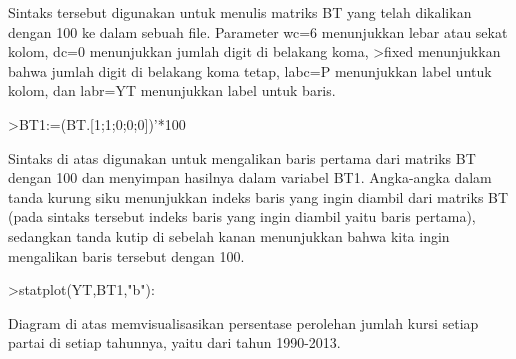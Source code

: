 \documentclass[a4paper,10pt]{article}
\begin{document}
\begin{eulernotebook}
\begin{eulercomment}
\begin{eulercomment}
\begin{eulercomment}
\begin{eulercomment}
\begin{eulercomment}
\begin{eulercomment}
\begin{eulercomment}
\begin{eulercomment}
\begin{eulercomment}
\begin{eulercomment}
\begin{eulercomment}
\begin{eulercomment}
\begin{eulercomment}
\begin{eulercomment}
\begin{eulercomment}
\begin{eulercomment}
\begin{euleroutput}
\end{euleroutput}
\begin{eulercomment}
Sintaks tersebut digunakan untuk menulis matriks BT yang telah
dikalikan dengan 100 ke dalam sebuah file. Parameter wc=6 menunjukkan
lebar atau sekat kolom, dc=0 menunjukkan jumlah digit di belakang
koma, \textgreater{}fixed menunjukkan bahwa jumlah digit di belakang koma tetap,
labc=P menunjukkan label untuk kolom, dan labr=YT menunjukkan label
untuk baris.
\end{eulercomment}
\begin{eulerprompt}
>BT1:=(BT.[1;1;0;0;0])'*100
\end{eulerprompt}
\begin{euleroutput}
  [84.29,  81.25,  81.1659,  82.7529,  72.9642,  61.8971,  79.8732]
\end{euleroutput}
\begin{eulercomment}
Sintaks di atas digunakan untuk mengalikan baris pertama dari matriks
BT dengan 100 dan menyimpan hasilnya dalam variabel BT1.  Angka-angka
dalam tanda kurung siku menunjukkan indeks baris yang ingin diambil
dari matriks BT (pada sintaks tersebut indeks baris yang ingin diambil
yaitu baris pertama), sedangkan tanda kutip di sebelah kanan
menunjukkan bahwa kita ingin mengalikan baris tersebut dengan 100.
\end{eulercomment}
\begin{eulerprompt}
>statplot(YT,BT1,"b"):
\end{eulerprompt}
\begin{eulercomment}
Diagram di atas memvisualisasikan persentase perolehan jumlah kursi
setiap partai di setiap tahunnya, yaitu dari tahun 1990-2013.


\end{eulercomment}
\end{eulercomment}
\end{eulercomment}
\end{eulercomment}
\end{eulercomment}
\end{eulercomment}
\end{eulercomment}
\end{eulercomment}
\end{eulercomment}
\end{eulercomment}
\end{eulercomment}
\end{eulercomment}
\end{eulercomment}
\end{eulercomment}
\end{eulercomment}
\end{eulercomment}
\end{eulercomment}
\end{eulernotebook}
\end{document}
